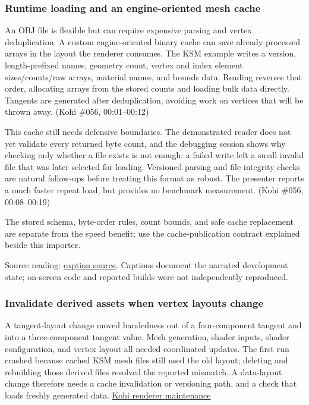 \subsubsection{Runtime loading and an engine-oriented mesh cache}\label{06-engine-ii-ch027-runtime-loading-and-an-engine-oriented-mesh-cache}

\hypertarget{06-engine-ii-ch027-runtime-loading-and-an-engine-oriented-mesh-cache}{}

An OBJ file is flexible but can require expensive parsing and vertex deduplication. A custom engine-oriented binary cache can save already processed arrays in the layout the renderer consumes. The KSM example writes a version, length-prefixed names, geometry count, vertex and index element sizes/counts/raw arrays, material names, and bounds data. Reading reverses that order, allocating arrays from the stored counts and loading bulk data directly. Tangents are generated after deduplication, avoiding work on vertices that will be thrown away. (Kohi \#056, 00:01--00:12)

This cache still needs defensive boundaries. The demonstrated reader does not yet validate every returned byte count, and the debugging session shows why checking only whether a file exists is not enough: a failed write left a small invalid file that was later selected for loading. Versioned parsing and file integrity checks are natural follow-ups before treating this format as robust. The presenter reports a much faster repeat load, but provides no benchmark measurement. (Kohi \#056, 00:08--00:19)

The stored schema, byte-order rules, count bounds, and safe cache replacement are separate from the speed benefit; use the cache-publication contract explained beside this importer.

Source reading: \href{https://www.youtube.com/watch?v=Uk2p3vKBMXE}{caption source}. Captions document the narrated development state; on-screen code and reported builds were not independently reproduced.

\subsubsection{Invalidate derived assets when vertex layouts change}\label{06-engine-ii-ch027-invalidate-derived-assets-when-vertex-layouts-change}

\hypertarget{06-engine-ii-ch027-invalidate-derived-assets-when-vertex-layouts-change}{}

A tangent-layout change moved handedness out of a four-component tangent and into a three-component tangent value. Mesh generation, shader inputs, shader configuration, and vertex layout all needed coordinated updates. The first run crashed because cached KSM mesh files still used the old layout; deleting and rebuilding those derived files resolved the reported mismatch. A data-layout change therefore needs a cache invalidation or versioning path, and a check that loads freshly generated data. \href{https://www.youtube.com/watch?v=x8ao57nbMlY}{Kohi renderer maintenance}


